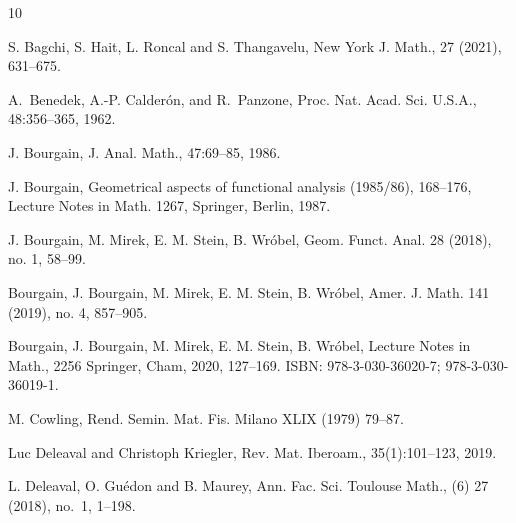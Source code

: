 \documentclass[11pt]{amsart}
\theoremstyle{definition}
\numberwithin{equation}{section}
\begin{document}
\begin{thebibliography}{10}

 S. Bagchi, S. Hait, L. Roncal and S. Thangavelu,  New York J. Math., 27 (2021), 631–675.

A.~Benedek, A.-P. Calder\'{o}n, and R.~Panzone,
  Proc. Nat. Acad. Sci. U.S.A., 48:356--365, 1962.

J. Bourgain,
 J. Anal. Math., 47:69--85, 1986.

 J. Bourgain,  Geometrical aspects
of functional analysis (1985/86), 168–176, Lecture Notes in Math. 1267, Springer, Berlin, 1987.

J. Bourgain, M. Mirek, E. M. Stein, B. Wr\'obel,  Geom. Funct. Anal. 28 (2018), no. 1, 58--99.

 Bourgain, J. Bourgain, M. Mirek, E. M. Stein, B. Wr\'obel,
 Amer. J. Math. 141 (2019), no. 4, 857--905.

 Bourgain, J. Bourgain, M. Mirek, E. M. Stein, B. Wr\'obel,  Lecture Notes in Math., 2256
Springer, Cham, 2020, 127--169.
ISBN: 978-3-030-36020-7; 978-3-030-36019-1.

 M. Cowling,  Rend. Semin. Mat. Fis. Milano XLIX (1979) 79--87.



Luc Deleaval and Christoph Kriegler,
 Rev. Mat. Iberoam., 35(1):101--123, 2019.

L. Deleaval, O. Gu\'edon and B. Maurey,
 Ann. Fac. Sci. Toulouse Math., (6) { 27} (2018), no.~1, 1--198.


\end{thebibliography}
\end{document}
